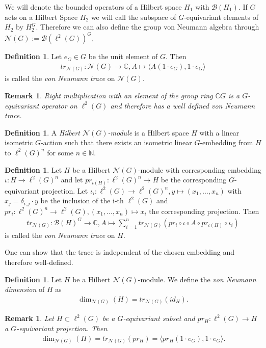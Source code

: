 \documentclass[12pt,a4paper]{scrartcl}
\theoremstyle{plain}
\newtheorem{Remark}[Theorem]{Remark}
\theoremstyle{definition}
\newtheorem{Definition}[Theorem]{Definition}
\numberwithin{equation}{section}
\newcommand{\C}{\mathbb{C}} %
\newcommand{\N}{\mathbb{N}} %
\newcommand{\2}{\mathbb{Z} / 2 \mathbb{Z}}
\newcommand{\1}{\bar{1}}
\newcommand{\0}{\bar{0}}
\begin{document}
We will denote the bounded operators of a Hilbert space $H_1$ with $\mathcal{B}(H_1)$. If $G$ acts on a Hilbert Space $H_2$ we will call the subspace of $G$-equivariant elements of $H_2$ by $H_2^G$. Therefore we can also define the group von Neumann algebra through $\mathcal{N}(G) := \mathcal{B}(\ell^2(G))^G$.
\begin{Definition}
	Let $e_G \in G$ be the unit element of $G$. Then
	\begin{align*}
		tr_{\mathcal{N}(G)}: \mathcal{N}(G) \to \C, A  \mapsto \langle A(1 \cdot e_G), 1 \cdot e_G \rangle
	\end{align*}
	is called the \emph{von Neumann trace} on $\mathcal{N}(G)$.
\end{Definition}
\begin{Remark}
	Right multiplication with an element of the group ring $\C G$ is a $G$-equivariant operator on $\ell^2(G)$ and therefore has a well defined von Neumann trace.
\end{Remark}
\begin{Definition}
	A \emph{Hilbert $\mathcal{N}(G)$-module} is a Hilbert space $H$ with a linear isometric $G$-action such that there exists an isometric linear $G$-embedding from $H$ to $\ell^2(G)^n$ for some $n \in \N$.
\end{Definition}
\begin{Definition}
	Let $H$ be a Hilbert $\mathcal{N}(G)$-module with corresponding embedding \\ $\iota: H \to \ell^2(G)^n$ and let $pr_{\iota(H)}: \ell^2(G)^n \to H$ be the corresponding $G$-equivariant projection. Let $\iota_i: \ell^2(G) \to \ell^2(G)^n, y \mapsto (x_1, \ldots, x_n)$ with $x_j = \delta_{i,j} \cdot y$ be the inclusion of the i-th $\ell^2(G)$ and $pr_i: \ell^2(G)^n \to \ell^2(G), (x_1, \ldots, x_n) \mapsto x_i$ the corresponding projection. Then 
	\begin{align*}
		tr_{\mathcal{N}(G)}: \mathcal{B}(H)^G \to \C, A \mapsto \sum_{i = 1}^{n} tr_{\mathcal{N}(G)}(pr_i \circ \iota \circ A \circ pr_{\iota(H)} \circ \iota_i)
	\end{align*}
	is called the \emph{von Neumann trace} on $H$.
\end{Definition}
One can show that the trace is independent of the chosen embedding and therefore well-defined.
\begin{Definition}\label{vNd}
	Let $H$ be a Hilbert $\mathcal{N}(G)$-module. We define the \emph{von Neumann dimension} of $H$ as
	\begin{align*}
		\dim_{\mathcal{N}(G)}(H) = tr_{\mathcal{N}(G)}(id_H).
	\end{align*}
\end{Definition}
\begin{Remark}\label{vNd_for_subsets}
	Let $H \subset \ell^2(G)$ be a $G$-equivariant subset and $pr_H: \ell^2(G) \to H$ a $G$-equivariant projection. Then\begin{align*}
	\dim_{\mathcal{N}(G)}(H) = tr_{\mathcal{N}(G)}(pr_H) = \langle pr_H (1 \cdot e_G), 1 \cdot e_G \rangle.
	\end{align*}
\end{Remark}
\end{document}
